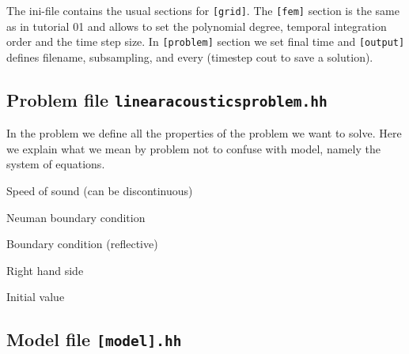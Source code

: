 \documentclass[a4paper,12pt]{article}
\theoremstyle{definition}
\theoremstyle{definition}
\begin{document}
The ini-file contains the usual sections for \lstinline{[grid]}. The
\lstinline{[fem]} section is the same as in tutorial 01 and allows to set
the polynomial degree, temporal integration order and the time step size. In \lstinline{[problem]} section we set final time and \lstinline{[output]} defines filename,
subsampling, and every (timestep cout to save a solution).     



%

\subsection{Problem file \lstinline{linearacousticsproblem.hh}}

In the problem we define all the properties of the problem we want to solve. Here we explain what we mean by problem not to confuse with model, namely the system of equations. %

Speed of sound (can be discontinuous)



Neuman boundary condition



Boundary condition (reflective)




Right hand side



Initial value


\subsection{Model file \lstinline{[model].hh} }
\end{document}
